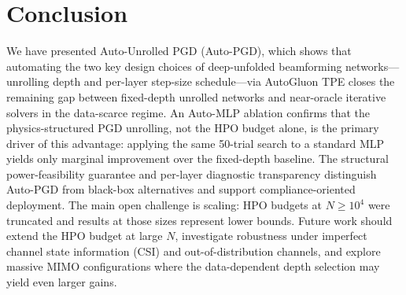 \documentclass[conference,11pt]{IEEEtran}
\begin{document}
\section{Conclusion}
We have presented Auto-Unrolled PGD (Auto-PGD), which shows that automating the two key design choices of deep-unfolded beamforming networks—unrolling depth and per-layer step-size schedule—via AutoGluon TPE closes the remaining gap between fixed-depth unrolled networks and near-oracle iterative solvers in the data-scarce regime. An Auto-MLP ablation confirms that the physics-structured PGD unrolling, not the HPO budget alone, is the primary driver of this advantage: applying the same 50-trial search to a standard MLP yields only marginal improvement over the fixed-depth baseline. The structural power-feasibility guarantee and per-layer diagnostic transparency distinguish Auto-PGD from black-box alternatives and support compliance-oriented deployment. The main open challenge is scaling: HPO budgets at $N{\geq}10^4$ were truncated and results at those sizes represent lower bounds. Future work should extend the HPO budget at large $N$, investigate robustness under imperfect channel state information (CSI) and out-of-distribution channels, and explore massive MIMO configurations where the data-dependent depth selection may yield even larger gains.



\end{document}
